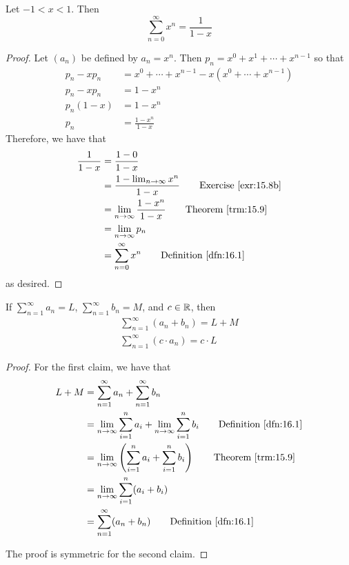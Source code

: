 \documentclass[../main.tex]{subfiles}
\begin{document}
\begin{theorem}\label{trm:16.7}
    Let $-1<x<1$. Then
    \begin{equation*}
        \sum_{n=0}^\infty x^n = \frac{1}{1-x}
    \end{equation*}
    \begin{proof}
        Let $(a_n)$ be defined by $a_n=x^n$. Then $p_n=x^0+x^1+\cdots+x^{n-1}$ so that
        \begin{align*}
            p_n-xp_n &= x^0+\cdots+x^{n-1}-x(x^0+\cdots+x^{n-1})\\
            p_n-xp_n &= 1-x^n\\
            p_n(1-x) &= 1-x^n\\
            p_n &= \frac{1-x^n}{1-x}
        \end{align*}
        Therefore, we have that
        \begin{align*}
            \frac{1}{1-x} &= \frac{1-0}{1-x}\\
            &= \frac{1-\lim_{n\to\infty}x^n}{1-x}\tag*{Exercise \ref{exr:15.8b}}\\
            &= \lim_{n\to\infty}\frac{1-x^n}{1-x}\tag*{Theorem \ref{trm:15.9}}\\
            &= \lim_{n\to\infty}p_n\\
            &= \sum_{n=0}^\infty x^n\tag*{Definition \ref{dfn:16.1}}
        \end{align*}
        as desired.
    \end{proof}
\end{theorem}

\begin{theorem}\label{trm:16.8}
    If $\sum_{n=1}^\infty a_n=L$, $\sum_{n=1}^\infty b_n=M$, and $c\in\mathbb{R}$, then
    \begin{gather*}
        \sum_{n=1}^\infty(a_n+b_n) = L+M\\
        \sum_{n=1}^\infty(c\cdot a_n) = c\cdot L
    \end{gather*}
    \begin{proof}
        For the first claim, we have that
        \begin{align*}
            L+M &= \sum_{n=1}^\infty a_n+\sum_{n=1}^\infty b_n\\
            &= \lim_{n\to\infty}\sum_{i=1}^na_i+\lim_{n\to\infty}\sum_{i=1}^nb_i\tag*{Definition \ref{dfn:16.1}}\\
            &= \lim_{n\to\infty}\left( \sum_{i=1}^na_i+\sum_{i=1}^nb_i \right)\tag*{Theorem \ref{trm:15.9}}\\
            &= \lim_{n\to\infty}\sum_{i=1}^n(a_i+b_i)\\
            &= \sum_{n=1}^\infty(a_n+b_n)\tag*{Definition \ref{dfn:16.1}}
        \end{align*}\par
        The proof is symmetric for the second claim.
    \end{proof}
\end{theorem}
\end{document}
